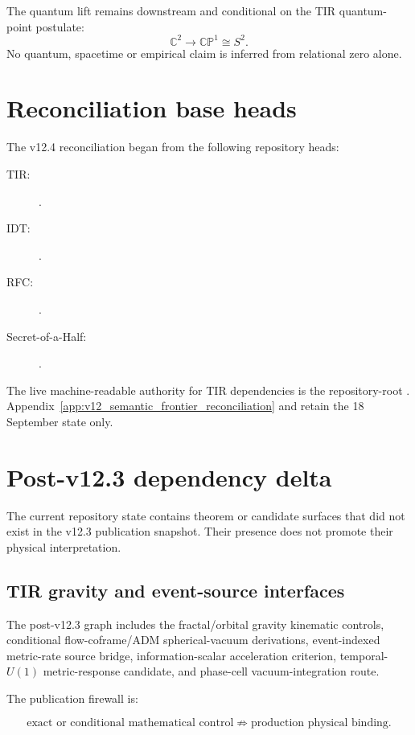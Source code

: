 The quantum lift remains downstream and conditional on the TIR quantum-point postulate:
\[
\mathbb C^2\to\mathbb{CP}^1\cong S^2.
\]
No quantum, spacetime or empirical claim is inferred from relational zero alone.

\section{Reconciliation base heads}

The v12.4 reconciliation began from the following repository heads:

\begin{description}
\item[TIR:] .
\item[IDT:] .
\item[RFC:] .
\item[Secret-of-a-Half:] .
\end{description}

The live machine-readable authority for TIR dependencies is the repository-root
. Appendix~\ref{app:v12_semantic_frontier_reconciliation}
and  retain the 18 September state only.

\section{Post-v12.3 dependency delta}

The current repository state contains theorem or candidate surfaces that did not exist in
the v12.3 publication snapshot. Their presence does not promote their physical interpretation.

\subsection{TIR gravity and event-source interfaces}

The post-v12.3 graph includes the fractal/orbital gravity kinematic controls, conditional
flow-coframe/ADM spherical-vacuum derivations, event-indexed metric-rate source bridge,
information-scalar acceleration criterion, temporal-$U(1)$ metric-response candidate, and
phase-cell vacuum-integration route.

The publication firewall is:

\[
\boxed{
\text{exact or conditional mathematical control}
\not\Rightarrow
\text{production physical binding}.
}
\]

